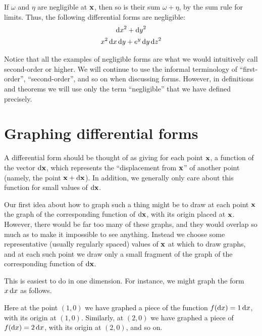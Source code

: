 \documentclass[12pt]{amsart}
\begin{document}
\begin{eg}
  If $\omega$ and $\eta$ are negligible at $\mathbf{x}$, then so is their sum $\omega+\eta$, by the sum rule for limits.
  Thus, the following differential forms are negligible:
  \begin{gather*}
    {\ensuremath{\mathrm{d} x}}^2 + {\mathrm{d} y}^2\\
    x^2 \,{\mathrm{d} x}\,{\mathrm{d} y} + e^{y}\,{\mathrm{d} y}\,{\mathrm{d} z}^2
  \end{gather*}
\end{eg}

Notice that all the examples of negligible forms are what we would intuitively call second-order or higher.
We will continue to use the informal terminology of ``first-order'', ``second-order'', and so on when discussing forms.
However, in definitions and theorems we will use only the term ``negligible'' that we have defined precisely.


\section{Graphing differential forms}
\label{sec:graphing-differential-forms}

A differential form should be thought of as giving for each point $\mathbf{x}$, a function of the vector ${\mathrm{d} \mathbf{x}}$, which represents the ``displacement from $\mathbf{x}$'' of another point (namely, the point $\mathbf{x}+{\mathrm{d} \mathbf{x}}$).
In addition, we generally only care about this function for small values of ${\mathrm{d} \mathbf{x}}$.

Our first idea about how to graph such a thing might be to draw at each point $\mathbf{x}$ the graph of the corresponding function of ${\mathrm{d} \mathbf{x}}$, with its origin placed at $\mathbf{x}$.
However, there would be far too many of these graphs, and they would overlap so much as to make it impossible to see anything.
Instead we choose some representative (usually regularly spaced) values of $\mathbf{x}$ at which to draw graphs, and at each such point we draw only a small fragment of the graph of the corresponding function of ${\mathrm{d} \mathbf{x}}$.

This is easiest to do in one dimension.
For instance, we might graph the form $x\,{\mathrm{d} x}$ as follows.
\begin{center}
\end{center}
Here at the point $(1,0)$ we have graphed a piece of the function $f({\mathrm{d} x}) = 1\,{\mathrm{d} x}$, with its origin at $(1,0)$.
Similarly, at $(2,0)$ we have graphed a piece of $f({\mathrm{d} x}) = 2\,{\mathrm{d} x}$, with its origin at $(2,0)$, and so on.
\end{document}

